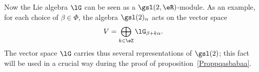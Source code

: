 Now the Lie algebra \( \lG\) can be seen as a \( \gsl(2,\eR)\)-module. As an example, for each choice of \( \beta\in\Phi\), the algebra \( \gsl(2)_{\alpha}\) acts on the vector space
\begin{equation}
    V=\bigoplus_{k\in\eZ}\lG_{\beta+k\alpha}.
\end{equation}
The vector space \( \lG\) carries thus several representations of \( \gsl(2)\); this fact will be used in a crucial way during the proof of proposition~\ref{Proppqasbabaa}.
